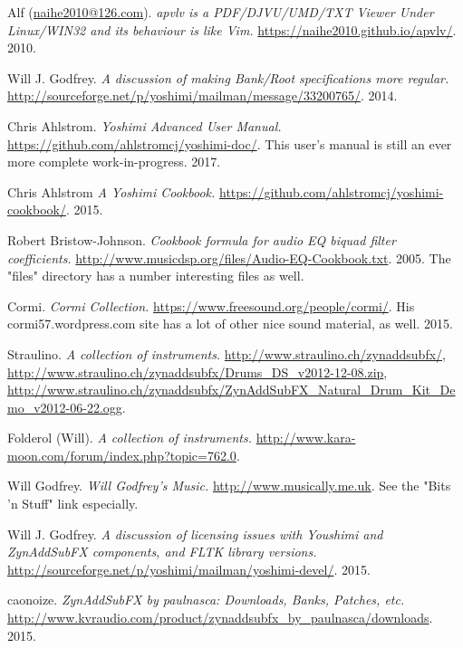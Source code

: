 \begin{thebibliography}{99}

   Alf (\href{mailto:naihe2010@126.com}{naihe2010@126.com}).
   \emph{apvlv is a PDF/DJVU/UMD/TXT Viewer Under Linux/WIN32 and its behaviour
   is like Vim.}
   \url{https://naihe2010.github.io/apvlv/}.
   2010.

   Will J. Godfrey.
   \emph{A discussion of making Bank/Root specifications more regular.}
   \url{http://sourceforge.net/p/yoshimi/mailman/message/33200765/}.
   2014.

   Chris Ahlstrom.
   \emph{Yoshimi Advanced User Manual.}
   \url{https://github.com/ahlstromcj/yoshimi-doc/}.
   This user's manual is still an ever more complete work-in-progress.
   2017.

   Chris Ahlstrom
   \emph{A Yoshimi Cookbook.}
   \url{https://github.com/ahlstromcj/yoshimi-cookbook/}.
   2015.

   Robert Bristow-Johnson.
   \emph{Cookbook formula for audio EQ biquad filter coefficients.}
   \url{http://www.musicdsp.org/files/Audio-EQ-Cookbook.txt}.
   2005.  The "files" directory has a number interesting files as well.

   Cormi.
   \emph{Cormi Collection.}
   \url{https://www.freesound.org/people/cormi/}.
   His cormi57.wordpress.com site has a lot of other nice sound material, as well.
   2015.

   Straulino.
   \emph{A collection of instruments.}
   \url{http://www.straulino.ch/zynaddsubfx/},
   \url{http://www.straulino.ch/zynaddsubfx/Drums\_DS\_v2012-12-08.zip},
   \url{http://www.straulino.ch/zynaddsubfx/ZynAddSubFX\_Natural\_Drum\_Kit\_Demo\_v2012-06-22.ogg}.

   Folderol (Will).
   \emph{A collection of instruments.}
   \url{http://www.kara-moon.com/forum/index.php?topic=762.0}.

   Will Godfrey.
   \emph{Will Godfrey's Music.}
   \url{http://www.musically.me.uk}.
   See the "Bits 'n Stuff" link especially.

   Will J. Godfrey.
   \emph{A discussion of licensing issues with Youshimi and ZynAddSubFX
   components, and FLTK library versions.}
   \url{http://sourceforge.net/p/yoshimi/mailman/yoshimi-devel/}.
   2015.

   caonoize.
   \emph{ZynAddSubFX by paulnasca: Downloads, Banks, Patches, etc.}
   \url{http://www.kvraudio.com/product/zynaddsubfx\_by\_paulnasca/downloads}.
   2015.


\end{thebibliography}
